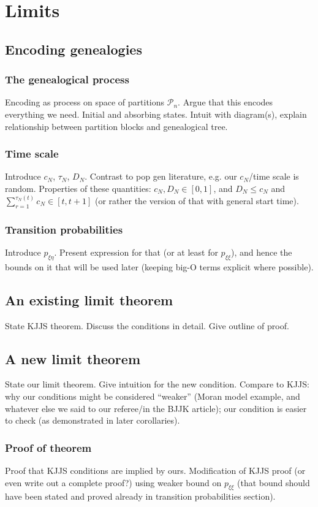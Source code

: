 \chapter{Limits}


\section{Encoding genealogies}

\subsection{The genealogical process}
Encoding as process on space of partitions $\mathcal{P}_n$. Argue that this encodes everything we need. Initial and absorbing states. Intuit with diagram(s), explain relationship between partition blocks and genealogical tree.

\subsection{Time scale}
Introduce $c_N$, $\tau_N$, $D_N$. Contrast to pop gen literature, e.g. our $c_N$/time scale is random. Properties of these quantities: $c_N, D_N \in [0,1]$, and $D_N \leq c_N$ and $\sum_{r=1}^{\tau_N(t)} c_N \in [t, t+1]$ (or rather the version of that with general start time).

\subsection{Transition probabilities}
Introduce $p_{\xi\eta}$. Present expression for that (or at least for $p_{\xi\xi}$), and hence the bounds on it that will be used later (keeping big-O terms explicit where possible).

\section{An existing limit theorem}
State KJJS theorem. Discuss the conditions in detail. Give outline of proof.

\section{A new limit theorem}
State our limit theorem. Give intuition for the new condition. Compare to KJJS: why our conditions might be considered ``weaker'' (Moran model example, and whatever else we said to our referee/in the BJJK article); our condition is easier to check (as demonstrated in later corollaries).

\subsection{Proof of theorem}
Proof that KJJS conditions are implied by ours. Modification of KJJS proof (or even write out a complete proof?) using weaker bound on $p_{\xi\xi}$ (that bound should have been stated and proved already in transition probabilities section).